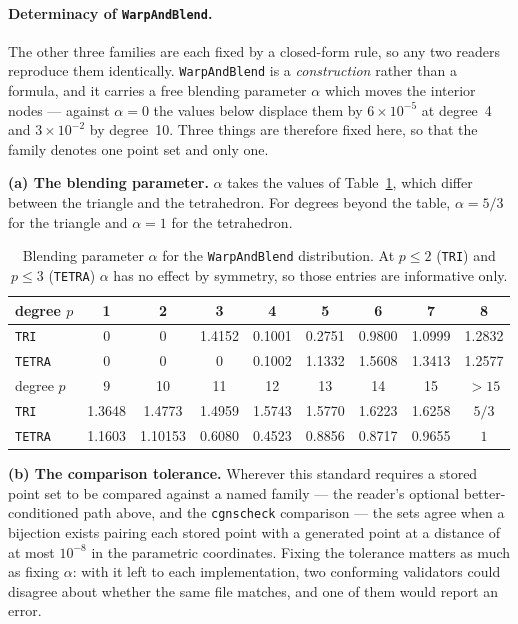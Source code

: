 \documentclass[11pt,letterpaper]{article}
\newif\ifvfourdraft
\newcommand{\vfour}[1]{\ifvfourdraft\textcolor{v4violet}{#1}\else#1\fi}
\newenvironment{v4block}{\ifvfourdraft\color{v4violet}\fi\ignorespaces}{\par}
\newcommand{\vfourmark}{\ifvfourdraft\textcolor{v4violet}{\textbf{[v4]}}\ \fi}
\begin{document}
\begin{v4block}
\paragraph{\vfourmark Determinacy of \texttt{WarpAndBlend}.}
\label{sec:wb-determinacy}
The other three families are each fixed by a closed-form rule, so any two readers
reproduce them identically.  \texttt{WarpAndBlend} is a \emph{construction} rather
than a formula, and it carries a free blending parameter $\alpha$ which moves the
interior nodes --- against $\alpha = 0$ the values below displace them by
$6\times10^{-5}$ at degree~4 and $3\times10^{-2}$ by degree~10.  Three things are
therefore fixed here, so that the family denotes one point set and only one.

\smallskip
\noindent\textbf{(a) The blending parameter.}  $\alpha$ takes the values of
Table~\ref{tab:wbalpha}, which differ between the triangle and the tetrahedron.
For degrees beyond the table, $\alpha = 5/3$ for the triangle and $\alpha = 1$ for
the tetrahedron.

\begin{table}[htbp]
\centering\small
{}
\begin{tabular}{@{} l *{8}{c} @{}}
\toprule
degree $p$      & 1 & 2 & 3 & 4 & 5 & 6 & 7 & 8 \\
\midrule
\texttt{TRI}    & 0 & 0 & 1.4152 & 0.1001 & 0.2751 & 0.9800 & 1.0999 & 1.2832 \\
\texttt{TETRA}  & 0 & 0 & 0      & 0.1002 & 1.1332 & 1.5608 & 1.3413 & 1.2577 \\
\midrule
degree $p$      & 9 & 10 & 11 & 12 & 13 & 14 & 15 & $>15$ \\
\midrule
\texttt{TRI}    & 1.3648 & 1.4773 & 1.4959 & 1.5743 & 1.5770 & 1.6223 & 1.6258 & $5/3$ \\
\texttt{TETRA}  & 1.1603 & 1.10153 & 0.6080 & 0.4523 & 0.8856 & 0.8717 & 0.9655 & $1$ \\
\bottomrule
\end{tabular}
\caption{\vfour{Blending parameter $\alpha$ for the \texttt{WarpAndBlend}
distribution.  At $p \le 2$ (\texttt{TRI}) and $p \le 3$ (\texttt{TETRA})
$\alpha$ has no effect by symmetry, so those entries are informative only.}}
\label{tab:wbalpha}
\end{table}

\noindent\textbf{(b) The comparison tolerance.}  Wherever this standard requires a
stored point set to be compared against a named family --- the reader's optional
better-conditioned path above, and the \texttt{cgnscheck} comparison --- the sets
agree when a bijection exists pairing each stored point with a generated point at
a distance of at most $10^{-8}$ in the parametric coordinates.  Fixing the
tolerance matters as much as fixing $\alpha$: with it left to each
implementation, two conforming validators could disagree about whether the same
file matches, and one of them would report an error.


\end{v4block}
\end{document}
